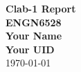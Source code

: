 
\begin{center}
    {\Large \textbf{Clab-1 Report}}\\ %
    
    \textbf{ENGN6528}\\
    \vspace*{\fill}
    \textbf{Your Name}\\
    \textbf{Your UID}\\
    \vspace*{\fill}
    \today \date{\ddmmyyyydate\today}
\end{center}

\newpage

